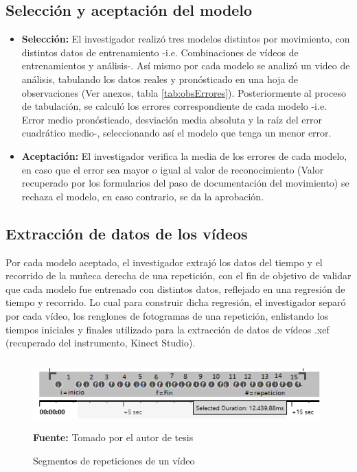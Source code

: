 \subsection{Selecci\'on y aceptaci\'on del modelo}
\begin{itemize}
\item \textbf{Selecci\'on:} El investigador realiz\'o tres modelos distintos por movimiento, con distintos datos de entrenamiento -i.e. Combinaciones de v\'ideos de entrenamientos y an\'alisis-. As\'i mismo por cada modelo se analiz\'o un video de an\'alisis, tabulando los datos reales y pron\'osticado en una hoja de observaciones (Ver anexos, tabla \ref{tab:obsErrores}). Posteriormente al proceso de tabulaci\'on, se calcul\'o los errores correspondiente de cada modelo -i.e. Error medio pron\'osticado, desviaci\'on media absoluta y la ra\'iz del error cuadr\'atico medio-, seleccionando as\'i el modelo que tenga un menor error. 
\item \textbf{Aceptaci\'on:} El investigador  verifica la media de los errores de cada modelo, en caso que el error sea mayor o igual  al valor de reconocimiento (Valor recuperado por los formularios del paso de documentaci\'on del movimiento) se rechaza el modelo, en caso contrario, se da la aprobaci\'on.
\end{itemize}
\subsection{Extracci\'on de datos de los v\'ideos}
Por cada modelo aceptado, el investigador extraj\'o los datos del tiempo y el recorrido de la mu\~neca derecha de una repetici\'on, con el fin de objetivo de validar que cada modelo fue entrenado con distintos datos, reflejado en una  regresi\'on de tiempo y recorrido. Lo cual para construir dicha regresi\'on, el investigador separ\'o por cada v\'ideo, los renglones de fotogramas de una repetici\'on, enlistando los tiempos iniciales y finales utilizado para la extracci\'on de datos de v\'ideos .xef (recuperado del instrumento, Kinect Studio).
\begin{figure}[H]
	\caption{Segmentos de repeticiones de un v\'ideo}
	\label{fig:segVideo}
	\centering
	\includegraphics[width=420px,height=100px]{graphics/separarPuntos.PNG} \\
	\textbf{Fuente:} Tomado por el autor de tesis
\end{figure} 
